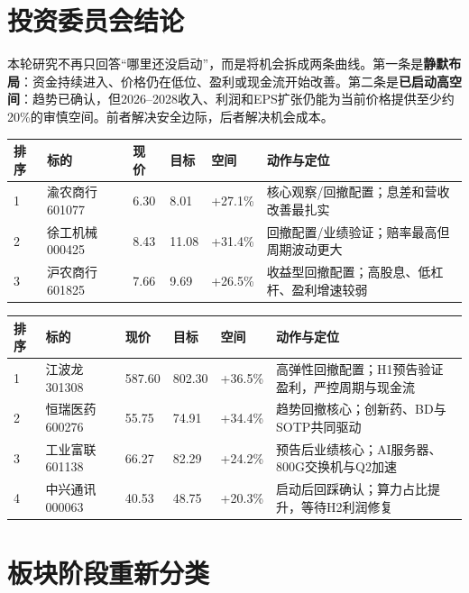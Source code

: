 \section{投资委员会结论}

本轮研究不再只回答“哪里还没启动”，而是将机会拆成两条曲线。第一条是\textbf{静默布局}：资金持续进入、价格仍在低位、盈利或现金流开始改善。第二条是\textbf{已启动高空间}：趋势已确认，但2026--2028收入、利润和EPS扩张仍能为当前价格提供至少约20\%的审慎空间。前者解决安全边际，后者解决机会成本。

\begin{dashboardbox}
\begin{tabularx}{\textwidth}{L{2.0cm}L{2.2cm}L{1.5cm}L{1.5cm}L{1.5cm}X}
\toprule
\textbf{排序} & \textbf{标的} & \textbf{现价} & \textbf{目标} & \textbf{空间} & \textbf{动作与定位} \\
 & 渝农商行 601077 & 6.30 & 8.01 & +27.1\% & 核心观察/回撤配置；息差和营收改善最扎实 \\
2 & 徐工机械 000425 & 8.43 & 11.08 & +31.4\% & 回撤配置/业绩验证；赔率最高但周期波动更大 \\
3 & 沪农商行 601825 & 7.66 & 9.69 & +26.5\% & 收益型回撤配置；高股息、低杠杆、盈利增速较弱 \\
\bottomrule
\end{tabularx}
\end{dashboardbox}

\begin{dashboardbox}
\begin{tabularx}{\textwidth}{L{2.2cm}L{2.1cm}L{1.6cm}L{1.6cm}L{1.6cm}X}
\toprule
\textbf{排序} & \textbf{标的} & \textbf{现价} & \textbf{目标} & \textbf{空间} & \textbf{动作与定位} \\
 & 江波龙 301308 & 587.60 & 802.30 & +36.5\% & 高弹性回撤配置；H1预告验证盈利，严控周期与现金流 \\
2 & 恒瑞医药 600276 & 55.75 & 74.91 & +34.4\% & 趋势回撤核心；创新药、BD与SOTP共同驱动 \\
3 & 工业富联 601138 & 66.27 & 82.29 & +24.2\% & 预告后业绩核心；AI服务器、800G交换机与Q2加速 \\
4 & 中兴通讯 000063 & 40.53 & 48.75 & +20.3\% & 启动后回踩确认；算力占比提升，等待H2利润修复 \\
\bottomrule
\end{tabularx}
\end{dashboardbox}

\section{板块阶段重新分类}

